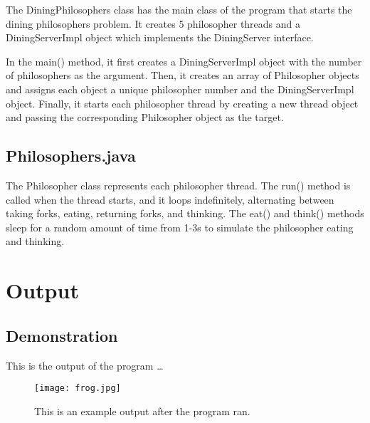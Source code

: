 \documentclass{article}
\begin{document}
The DiningPhilosophers class has the main class of the program that starts the dining philosophers problem. It creates 5 philosopher threads and a DiningServerImpl object which implements the DiningServer interface.

In the main() method, it first creates a DiningServerImpl object with the number of philosophers as the argument. Then, it creates an array of Philosopher objects and assigns each object a unique philosopher number and the DiningServerImpl object. Finally, it starts each philosopher thread by creating a new thread object and passing the corresponding Philosopher object as the target.

\subsection{Philosophers.java}

The Philosopher class represents each philosopher thread. The run() method is called when the thread starts, and it loops indefinitely, alternating between taking forks, eating, returning forks, and thinking. The eat() and think() methods sleep for a random amount of time from 1-3s to simulate the philosopher eating and thinking.

\section{Output}
\subsection{Demonstration}

  

This is the output of the program \dots
  \begin{figure}
    \centering
    \texttt{[image: frog.jpg]}
    \caption{\label{fig:frog}This is an example output after the program ran.}
    \end{figure}
\end{document}
